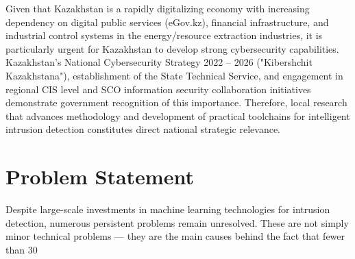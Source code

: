 Given that Kazakhstan is a rapidly digitalizing economy with increasing dependency on digital public services (eGov.kz), financial infrastructure, and industrial control systems in the energy/resource extraction industries, it is particularly urgent for Kazakhstan to develop strong cybersecurity capabilities. Kazakhstan's National Cybersecurity Strategy 2022 -- 2026 ("Kibershchit Kazakhstana"), establishment of the State Technical Service, and engagement in regional CIS level and SCO information security collaboration initiatives demonstrate government recognition of this importance. Therefore, local research that advances methodology and development of practical toolchains for intelligent intrusion detection constitutes direct national strategic relevance.

\section{Problem Statement}

Despite large-scale investments in machine learning technologies for intrusion detection, numerous persistent problems remain unresolved. These are not simply minor technical problems --- they are the main causes behind the fact that fewer than 30%

